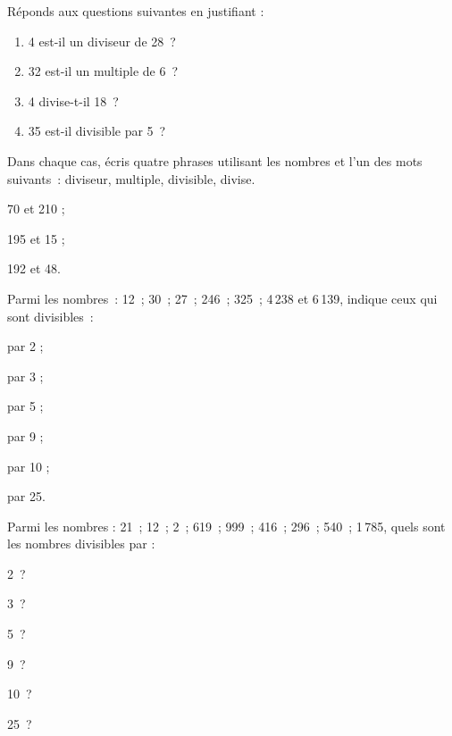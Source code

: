 

\begin{exercice}[Vocabulaire]
Réponds aux questions suivantes en justifiant :
\begin{enumerate}
 \item 4 est-il un diviseur de 28 ?
 \item 32 est-il un multiple de 6 ?
 \item 4 divise-t-il 18 ?
 \item 35 est-il divisible par 5 ?
 \end{enumerate}
\end{exercice}

\begin{exercice}
Dans chaque cas, écris quatre phrases utilisant les nombres et l'un des mots suivants : diviseur, multiple, divisible, divise.
\begin{colenumerate}{3}     
 \item 70 et 210 ;
 \item 195 et 15 ;
 \item 192 et 48.
 \end{colenumerate}
\end{exercice}

\begin{exercice}
Parmi les nombres : 12 ; 30 ; 27 ; 246 ; 325 ; 4\,238 et 6\,139, indique ceux qui sont divisibles :
\begin{colenumerate}{3}     
 \item par 2 ;
 \item par 3 ;
 \item par 5 ;
 \item par 9 ;
 \item par 10 ;
 \item par 25.
 \end{colenumerate}
\end{exercice}

\begin{exercice}
Parmi les nombres : 21 ; 12 ; 2 ; 619 ; 999 ; 416 ; 296 ; 540 ; 1\,785, quels sont les nombres divisibles par :
\begin{colenumerate}{3}     
 \item 2 ?
 \item 3 ?
 \item 5 ?
 \item 9 ?
 \item 10 ?
 \item 25 ?
 \end{colenumerate}
\end{exercice} 

